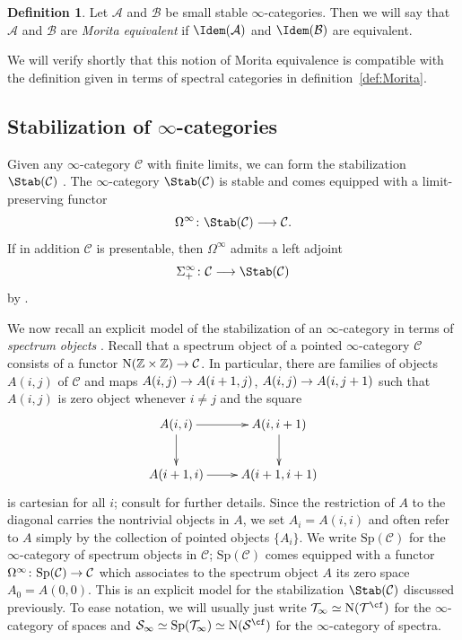 \documentclass{amsart}
\renewcommand{\to}{\mathchoice{\longrightarrow}{\rightarrow}{\rightarrow}{\rightarrow}}
\newcommand{\cS}{{\mathcal S}}
\let\catsymbfont\mathcal
\newcommand{\aA}{{\catsymbfont{A}}}
\newcommand{\aB}{{\catsymbfont{B}}}
\newcommand{\aC}{{\catsymbfont{C}}}
\newcommand{\aS}{{\catsymbfont{S}}}
\newcommand{\aT}{{\catsymbfont{T}}}
\newcommand{\C}{\catsymbfont{C}}
\newcommand{\T}{\mathcal{T}}
\newcommand{\bZ}{{\mathbb{Z}}}
\newcommand{\N}{\mathrm{N}}
\newcommand{\ispec}{\aS_{\infty}}
\newcommand{\Spec}{\mathrm{Sp}}%
\renewcommand{\i}{\infty}
\numberwithin{equation}{section}
\theoremstyle{definition}
\newtheorem{definition}[equation]{Definition}
\begin{document}
\begin{definition}\label{defn:iMor}
Let $\aA$ and $\aB$ be small stable $\i$-categories.  Then we will say
that $\aA$ and $\aB$ are {\em Morita equivalent} if $\Idem(\aA)$ and
$\Idem(\aB)$ are equivalent.
\end{definition}

We will verify shortly that this notion of Morita equivalence is
compatible with the definition given in terms of spectral categories
in definition~\ref{def:Morita}.

\subsection{Stabilization of $\i$-categories}\label{sec:stabilization}

Given any $\i$-category $\aC$ with finite limits, we can form the
stabilization $\Stab(\aC)$ \cite[\S 1.4]{HAG}. 
The $\i$-category $\Stab(\aC)$ is stable
and comes equipped with a limit-preserving functor  
\[
\Omega^{\infty} \colon \Stab(\aC) \to \aC.
\]
If in addition $\aC$ is presentable, then $\Omega^{\infty}$ admits a left adjoint
\[
\Sigma^\infty_+ \colon \aC \to \Stab(\aC)
\]
by \cite[1.4.4.4]{HAG}.

We now recall an explicit model of the stabilization of an
$\i$-category in terms of {\em spectrum objects} \cite[\S
1.4.2]{HAG}.  Recall that a spectrum object of a pointed $\i$-category
$\C$ consists of a functor $\N(\bZ \times \bZ) \to \C$.  In
particular, there are families of objects $A(i,j)$ of $\C$ and maps
$A(i,j)\to A(i+1,j)$, $A(i,j)\to A(i,j+1)$ such that $A(i,j)$ is zero
object whenever $i\neq j$ and the square 
\[
\xymatrix{
A(i,i)\ar[r]\ar[d] & A(i,i+1)\ar[d]\\
A(i+1,i)\ar[r] & A(i+1,i+1)}
\]
is cartesian for all $i$; consult \cite[1.4.2.4]{HAG} for further
details. Since the restriction of $A$ to the diagonal carries the
nontrivial objects in $A$, we set $A_i=A(i,i)$ and often refer to $A$
simply by the collection of pointed objects $\{A_i\}$.  We write
$\Spec(\C)$ for the $\i$-category of spectrum objects in $\C$;
$\Spec(\C)$ comes equipped with a functor
$\Omega^\i \colon \Spec(\C)\to\C$ which associates to the spectrum
object $A$ its zero space $A_0=A(0,0)$.  This is an explicit model for
the stabilization $\Stab(\aC)$ discussed previously.  To ease
notation, we will usually just write $\aT_\i\simeq\N(\T^{\cf})$ for the $\i$-category of spaces and $\ispec\simeq\Spec(\aT_\i)\simeq\N(\cS^{\cf})$ for the $\i$-category of spectra.
\end{document}

